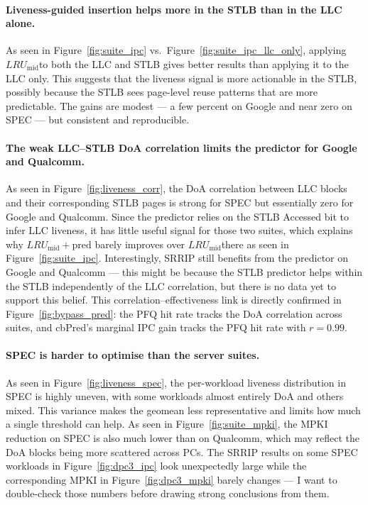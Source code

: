 \documentclass[12pt]{article}
\newcommand{\lrumid}{$LRU_\text{mid}$}
\begin{document}
\paragraph{Liveness-guided insertion helps more in the STLB than in the LLC alone.}
As seen in Figure~\ref{fig:suite_ipc} vs.\ Figure~\ref{fig:suite_ipc_llc_only},
applying \lrumid to both the LLC and STLB gives better results than
applying it to the LLC only. This suggests that the liveness signal is more
actionable in the STLB, possibly because the STLB sees page-level reuse patterns
that are more predictable. The gains are modest --- a few percent on Google and near
zero on SPEC --- but consistent and reproducible.

\paragraph{The weak LLC--STLB DoA correlation limits the predictor for Google and Qualcomm.}
As seen in Figure~\ref{fig:liveness_corr}, the DoA correlation between LLC blocks
and their corresponding STLB pages is strong for SPEC but essentially zero for
Google and Qualcomm. Since the predictor relies on the STLB Accessed bit to infer
LLC liveness, it has little useful signal for those two suites, which explains why
$LRU_\text{mid}+\text{pred}$ barely improves over \lrumid there as seen in
Figure~\ref{fig:suite_ipc}. Interestingly, SRRIP still benefits from the predictor
on Google and Qualcomm --- this might be because the STLB predictor helps within
the STLB independently of the LLC correlation, but there is no data yet to support
this belief.
This correlation--effectiveness link is directly confirmed in
Figure~\ref{fig:bypass_pred}: the PFQ hit rate tracks the DoA correlation
across suites, and cbPred's marginal IPC gain tracks the PFQ hit rate with
$r=0.99$.

\paragraph{SPEC is harder to optimise than the server suites.}
As seen in Figure~\ref{fig:liveness_spec}, the per-workload liveness distribution
in SPEC is highly uneven, with some workloads almost entirely DoA and others mixed.
This variance makes the geomean less representative and limits how much a single
threshold can help. As seen in Figure~\ref{fig:suite_mpki}, the MPKI reduction on
SPEC is also much lower than on Qualcomm, which may reflect the DoA blocks being
more scattered across PCs. The SRRIP results on some SPEC workloads in
Figure~\ref{fig:dpc3_ipc} look unexpectedly large while the corresponding MPKI in
Figure~\ref{fig:dpc3_mpki} barely changes --- I want to double-check those numbers
before drawing strong conclusions from them.
\end{document}
